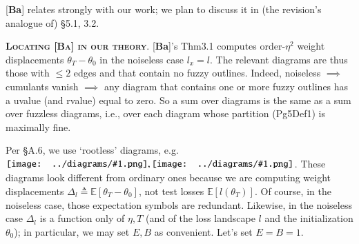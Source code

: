 \documentclass[12pt]{article}
\newcommand{\Rb}{\textmd{\textsf{\color{green!60}  {R2}}}}
\newcommand{\EE}{\mathbb{E}}
\newcommand{\dfn}[1]{\textmd{\textsf{Def#1}}}
\newcommand{\pag}[1]{\textmd{{\color{gray}Pg}{#1}}}
\newcommand{\thm}[1]{\textmd{{\color{gray}Thm}{#1}}}
\newcommand{\cit}[1]{[\textbf{#1}]}
\newcommand{\moosect}[1]{\par\noindent\hspace{-1cm}\textsc{\textbf{#1}}.}
\newcommand{\sizeddia}[2]{%
    \begin{gathered}%
        \texttt{[image: ../diagrams/\#1.png]}%
    \end{gathered}%
}
\newcommand{\mdia}[1]{\protect \sizeddia{#1}{0.14}}
\begin{document}

    \newcommand{\LaT}{\Lambda_{\text{\tiny\VarClock}}}
    \newcommand{\Lad}{\Lambda_{\text{\tiny\Thermo{4}}}}

    \noindent
    \cit{Ba}
    relates strongly with our work; we plan to discuss it in (the revision's
    analogue of) \S{5.1, 3.2}.

\moosect{Locating \cit{Ba} in our theory}
    \cit{Ba}'s \thm{3.1} computes order-$\eta^2$ weight
    displacements $\theta_T-\theta_0$ in the noiseless case $l_x=l$.  The
    relevant diagrams are thus those with $\leq 2$ edges and that contain no
    fuzzy outlines.
    Indeed, noiseless $\implies$ cumulants vanish $\implies$ any diagram that
    contains one or more fuzzy outlines has a uvalue (and rvalue) equal to
    zero.  So a sum over diagrams is the same as a sum over fuzzless diagrams,
    i.e., over each diagram whose partition (\pag{5}\dfn{1}) is maximally fine.

    Per \S{A.6}, we use `rootless' diagrams, e.g.\
    $\mdia{MOOc(0-1)(01-1)}, \mdia{MOOc(0-1-2)(01-12-2)}$.  These diagrams look
    different from ordinary ones because we are computing weight displacements
    $\Delta_l \triangleq \EE[\theta_T-\theta_0]$, not test losses
    $\EE[l(\theta_T)]$.  Of course, in the noiseless case, those expectation
    symbols are redundant.  Likewise, in the noiseless case $\Delta_l$ is a
    function only of $\eta, T$ (and of the loss landscape $l$ and the
    initialization $\theta_0$); in particular, we may set $E,B$ as convenient.
    Let's set $E=B=1$.
\end{document}
